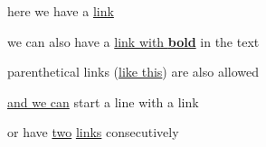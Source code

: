 
here we have a \href{www.yahoo.com}{link}

we can also have a \href{http://github.com}{link with \textbf{bold}} in the text

parenthetical links (\href{www.yahoo.com}{like this}) are also allowed

\href{facebook.com}{and we can} start a line with a link

or have \href{example.com}{two} \href{reddit.com}{links} consecutively